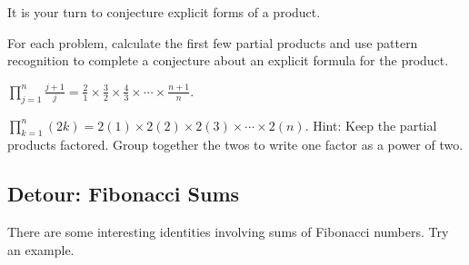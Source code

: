 It is your turn to conjecture explicit forms of a product.

\begin{act}
\label{act_prod_conj}
    For each problem, calculate the first few partial products and use pattern recognition to complete a conjecture about an explicit formula for the product.  
        \begin{actpart}
            \item $\displaystyle \prod_{j=1}^n \frac{j+1}{j} = \frac{2}{1} \times \frac{3}{2} \times \frac{4}{3} \times \cdots \times \frac{n+1}{n}$. %

            \item $\displaystyle \prod_{k=1}^n(2k) = 2(1) \times 2(2) \times 2(3) \times \cdots \times 2(n)$. 
            Hint: Keep the partial products factored.  Group together the twos to write one factor as a power of two. %
        \end{actpart}
\end{act}

\newcommand{\subsumfib}{Detour: Fibonacci Sums}
\subsection{\subsumfib}
\label{sub_sum_fib}

There are some interesting identities involving sums of Fibonacci numbers.  Try an example.

